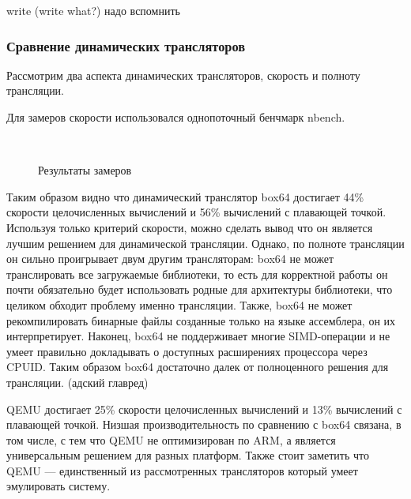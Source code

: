 write (write what?) надо вспомнить

\subsubsection{Сравнение динамических трансляторов}

Рассмотрим два аспекта динамических трансляторов, скорость и полноту трансляции.

Для замеров скорости использовался однопоточный бенчмарк nbench.

\begin{figure}[hbtp]
	\centering
	\\
	\caption{Результаты замеров}
	\label{fig:speed}
\end{figure}

Таким образом видно что динамический транслятор box64 достигает 44\% скорости целочисленных вычислений и 56\% вычислений с плавающей точкой. Используя только критерий скорости, можно сделать вывод что он является лучшим решением для динамической трансляции. Однако, по полноте трансляции он сильно проигрывает двум другим трансляторам: box64 не может транслировать все загружаемые библиотеки, то есть для корректной работы он почти обязательно будет использовать родные для архитектуры библиотеки, что целиком обходит проблему именно трансляции. Также, box64 не может рекомпилировать бинарные файлы созданные только на языке ассемблера, он их интерпретирует. Наконец, box64 не поддерживает многие SIMD-операции и не умеет правильно докладывать о доступных расширениях процессора через CPUID. Таким образом box64 достаточно далек от полноценного решения для трансляции. (адский главред)

QEMU достигает 25\% скорости целочисленных вычислений и 13\% вычислений с плавающей точкой. Низшая производительность по сравнению с box64 связана, в том числе, с тем что QEMU не оптимизирован по ARM, а является универсальным решением для разных платформ. Также стоит заметить что QEMU --- единственный из рассмотренных трансляторов который умеет эмулировать систему.

